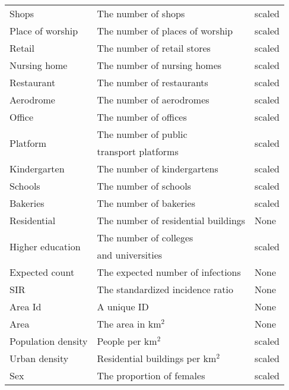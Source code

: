 \begin{table}[H]
\begin{tabular}{l l l}
Shops & The number of shops & scaled \\
Place of worship & The number of places of worship & scaled \\
Retail & The number of retail stores & scaled \\
Nursing home & The number of nursing homes & scaled \\
Restaurant & The number of restaurants & scaled \\
Aerodrome & The number of aerodromes & scaled \\
Office & The number of offices & scaled \\
\multirow{2}{*}{Platform} & The number of public & \multirow{2}{*}{scaled} \\
& transport platforms \\
Kindergarten & The number of kindergartens & scaled \\
Schools & The number of schools & scaled \\
Bakeries & The number of bakeries & scaled \\
Residential & The number of residential buildings & None \\
\multirow{2}{*}{Higher education} & The number of colleges & \multirow{2}{*}{scaled} \\
& and universities \\
Expected count & The expected number of infections & None \\
SIR & The standardized incidence ratio & None \\
Area Id & A unique ID & None \\
Area & The area in km$^2$ & None \\
Population density & People per km$^2$ & scaled  \\
\multirow{1}{*}{Urban density} & Residential buildings per km$^2$  & scaled\\
Sex & The proportion of females & scaled \\
\bottomrule
\end{tabular}
\end{table}
